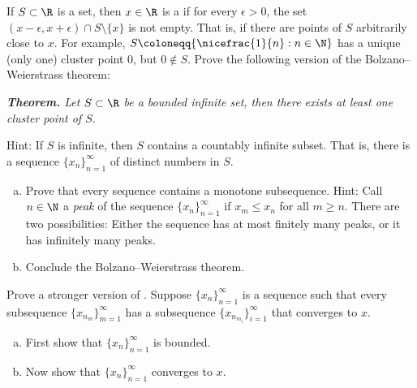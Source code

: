 \begin{exercise}
If $S \subset \R$ is a set, then $x \in \R$ is a \emph{}
if for every $\epsilon > 0$, the set $(x-\epsilon,x+\epsilon) \cap S
\setminus \{ x \}$ is not empty.  That is, if there are points of $S$
arbitrarily close to $x$.
For example, $S \coloneqq \{ \nicefrac{1}{n} : n \in \N \}$ has a unique (only
one) cluster point $0$, but $0 \notin S$.
Prove the following version of the Bolzano--Weierstrass theorem:

\medskip

\noindent
\emph{\textbf{Theorem.} Let $S \subset \R$ be a bounded infinite set,
then there exists at least one cluster point of $S$}.

\medskip

Hint: If $S$ is infinite, then $S$ contains a countably infinite subset.
That is, there is a sequence $\{ x_n \}_{n=1}^\infty$ of distinct numbers in $S$.
\end{exercise}

\begin{samepage}
\begin{exercise}[Challenging]
\leavevmode
\begin{enumerate}[a)]
\item
Prove that every sequence contains a monotone subsequence.
Hint: Call $n \in \N$ a \emph{peak}
of the sequence
$\{ x_n \}_{n=1}^\infty$
if $x_m \leq x_n$ for all $m \geq n$.
There are two possibilities: Either the sequence has at most finitely many
peaks,
or it has infinitely many peaks.
\item
Conclude the Bolzano--Weierstrass theorem.
\end{enumerate}
\end{exercise}
\end{samepage}

\begin{exercise}
\pagebreak[2]
Prove a stronger version of .
Suppose $\{ x_n \}_{n=1}^\infty$ is a sequence such that every subsequence
$\{ x_{n_m} \}_{m=1}^\infty$ has a subsequence
$\{ x_{n_{m_i}} \}_{i=1}^\infty$ that converges to $x$.
\begin{enumerate}[a)]
\item
First show that $\{ x_n \}_{n=1}^\infty$ is
bounded.
\item
Now show that $\{ x_n \}_{n=1}^\infty$ converges to $x$.
\end{enumerate}
\end{exercise}


